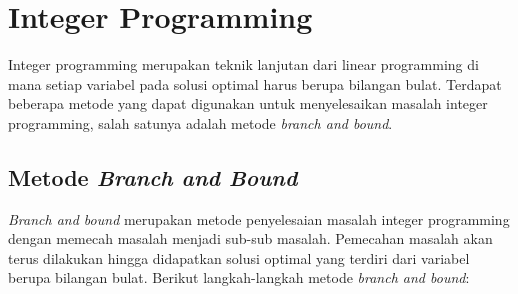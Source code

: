 \section{Integer Programming~\cite{winston2004operations}}

Integer programming merupakan teknik lanjutan dari linear programming di mana setiap variabel pada solusi optimal harus berupa bilangan bulat. Terdapat beberapa metode yang dapat digunakan untuk menyelesaikan masalah integer programming, salah satunya adalah metode \textit{branch and bound}.

\subsection{Metode \textit{Branch and Bound}}
\textit{Branch and bound} merupakan metode penyelesaian masalah integer programming dengan memecah masalah menjadi sub-sub masalah. Pemecahan masalah akan terus dilakukan hingga didapatkan solusi optimal yang terdiri dari variabel berupa bilangan bulat. Berikut langkah-langkah metode \textit{branch and bound}:

